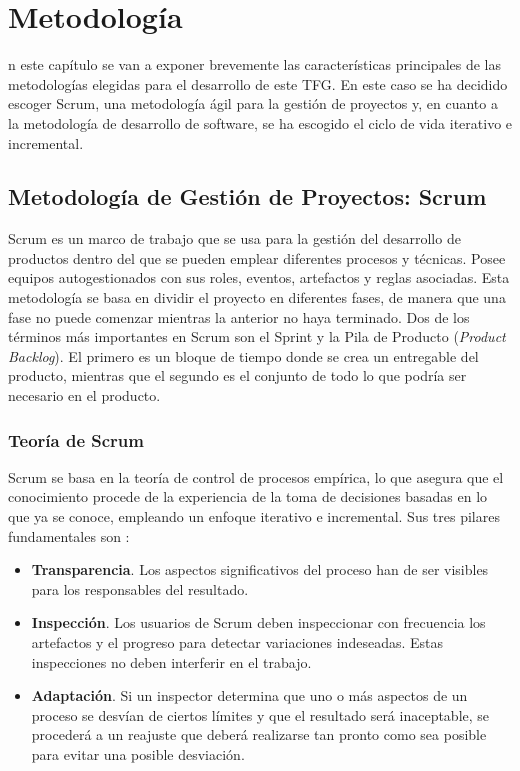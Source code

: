 \chapter{Metodología}
\label{chap:metodologia}

n este capítulo se van a exponer brevemente las características principales de las metodologías elegidas para el desarrollo de este \acs{TFG}. En este caso se ha decidido escoger Scrum, una metodología ágil para la gestión de proyectos y, en cuanto a la metodología de desarrollo de software, se ha escogido el ciclo de vida iterativo e incremental.

\section{Metodología de Gestión de Proyectos: Scrum}
Scrum \cite{Schwaber2017} es un marco de trabajo que se usa para la gestión del desarrollo de productos dentro del que se pueden emplear diferentes procesos y técnicas. Posee equipos autogestionados con sus roles, eventos, artefactos y reglas asociadas. Esta metodología se basa en dividir el proyecto en diferentes fases, de manera que una fase no puede comenzar mientras la anterior no haya terminado. Dos de los términos más importantes en Scrum son el Sprint y la Pila de Producto (\textit{Product Backlog}). El primero es un bloque de tiempo donde se crea un entregable del producto, mientras que el segundo es el conjunto de todo lo que podría ser necesario en el producto.

\subsection{Teoría de Scrum}
Scrum se basa en la teoría de control de procesos empírica, lo que asegura que el conocimiento procede de la experiencia de la toma de decisiones basadas en lo que ya se conoce, empleando un enfoque iterativo e incremental. Sus tres pilares fundamentales son \cite{Schwaber2017}:

\begin{itemize}
	\item \textbf{Transparencia}. Los aspectos significativos del proceso han de ser visibles para los responsables del resultado.
	\item \textbf{Inspección}. Los usuarios de Scrum deben inspeccionar con frecuencia los artefactos y el progreso para detectar variaciones indeseadas. Estas inspecciones no deben interferir en el trabajo.
	\item \textbf{Adaptación}. Si un inspector determina que uno o más aspectos de un proceso se desvían de ciertos límites y que el resultado será inaceptable, se procederá a un reajuste que deberá realizarse tan pronto como sea posible para evitar una posible desviación.
\end{itemize}

